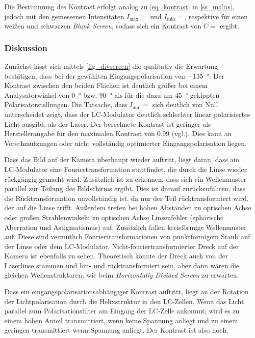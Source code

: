 \documentclass[
	a4paper,
	12pt,
	pagesize,
	ngerman
]{scrartcl}
\begin{document}
		Die Bestimmung des Kontrast erfolgt analog zu \cref{eq_kontrast} in \cref{ss_malus}, jedoch mit  den gemessenen Intensitäten $I_\text{max}=$ und $I_\text{min}=$, respektive für einen weißen und schwarzen \textit{Blank Screen}, sodass sich ein Kontrast von $C=$ ergibt.
			\subsubsection*{Diskussion}
			Zunächst lässt sich mittels \cref{fig_divscreen} die qualitativ die Erwartung bestätigen, dass bei der gewählten Eingangspolarisation von \SI{-135}{\degree}.
			Der Kontrast zwischen den beiden Flächen ist deutlich größer bei einem Analysatorwinkel von \SI{0}{\degree} bzw. \SI{90}{\degree} als für die dazu um \SI{45}{\degree} gekippten Polarisatorstellungen.
			Die Tatsache, dass $I_\text{min} = $ sich deutlich von Null unterscheidet zeigt, dass der LC-Modulator deutlich schlechter linear polarisiertes Licht ausgibt, als der Laser.
			Der berechnete Kontrast ist geringer als Herstellerangabe für den maximalen Kontrast von \SI{0,99}{} (vgl.\cite{Handbuch}).
			Dies kann an Verschmutzungen oder nicht vollständig optimierter Eingangspolarisation liegen.

			Dass das Bild auf der Kamera überhaupt wieder auftritt, liegt daran, dass am LC-Modulator eine Fouriertransformation stattfindet, die durch die Linse wieder rückgängig gemacht wird.
			Zusätzlich ist zu erkennen, dass sich ein Wellenmuster parallel zur Teilung des Bildschirms ergibt.
			Dies ist darauf zurückzuführen, dass die Rücktransformation unvollständig ist, da nur der Teil rücktransformiert wird, der auf die Linse trifft.
			Außerdem treten bei hohen Abständen zu optischen Achse oder großen Strahlenwinkeln zu optischen Achse Linsenfehler (sphärische Aberration und Astigmatismus) auf.
			Zusätzlich fallen kreisförmige Wellenmuster auf.
			Diese sind vermutlich Fouriertransformationen von punktförmigem Staub auf der Linse oder dem LC-Modulator.
			Nicht-fouriertransformierter Dreck auf der Kamera ist ebenfalls zu sehen.
			Theoretisch könnte der Dreck auch von der Laserlinse stammen und hin- und rücktransformiert sein, aber dann wären die gleichen Wellenstrukturen, wie beim \textit{Horizontally Divided Screen} zu erwarten.

			Dass ein eingangspolarisationsabhängiger Kontrast auftritt, liegt an der Rotation der Lichtpolarisation durch die Helixstruktur in den LC-Zellen.
			Wenn das Licht parallel zum Polarisationsfilter am Eingang der LC-Zelle ankommt, wird es zu einem hohen Anteil transmittiert, wenn keine Spannung anliegt und zu einem geringen transmittiert wenn Spannung anliegt.
			Der Kontrast ist also hoch.
\end{document}
